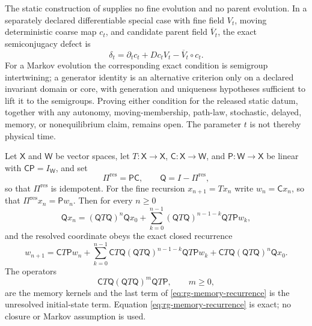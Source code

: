 \medskip
{}
The static construction of  supplies no fine evolution and no
parent evolution. In a separately declared differentiable special case with fine field $V_t$, moving
deterministic coarse map $c_t$, and candidate parent field $\overline V_t$, the exact semiconjugacy
defect is
\begin{equation}
\delta_t=\partial_tc_t+Dc_tV_t-\overline V_t\circ c_t.
\label{eq:rg-pointwise-parent-semiconjugacy-defect}
\end{equation}
For a Markov evolution the corresponding exact condition is semigroup intertwining; a generator
identity is an alternative criterion only on a declared invariant domain or core, with generation
and uniqueness hypotheses sufficient to lift it to the semigroups. Proving either condition for the
released static datum, together with any autonomy, moving-membership, path-law, stochastic,
delayed, memory, or nonequilibrium claim, remains open. The parameter $t$ is not thereby physical
time. 

Let $\mathsf X$ and $\mathsf W$ be vector spaces, let $T:\mathsf X\to\mathsf X$,
$\mathsf C:\mathsf X\to\mathsf W$, and $\mathsf P:\mathsf W\to\mathsf X$ be
linear with $\mathsf C\mathsf P=I_{\mathsf W}$, and set
\begin{equation}
\Pi^{\mathrm{res}}=\mathsf P\mathsf C,
\qquad
\mathsf Q=I-\Pi^{\mathrm{res}},
\label{eq:rg-resolved-projection}
\end{equation}
so that $\Pi^{\mathrm{res}}$ is idempotent.  For the fine recursion
$x_{n+1}=Tx_n$ write $w_n=\mathsf Cx_n$, so that
$\Pi^{\mathrm{res}}x_n=\mathsf Pw_n$.  Then for every $n\geq0$
\begin{equation}
\mathsf Qx_n
=(\mathsf QT\mathsf Q)^n\mathsf Qx_0
+\sum_{k=0}^{n-1}
(\mathsf QT\mathsf Q)^{n-1-k}\mathsf QT\mathsf Pw_k,
\label{eq:rg-unresolved-solution}
\end{equation}
and the resolved coordinate obeys the exact closed recurrence
\begin{equation}
w_{n+1}
=\mathsf CT\mathsf Pw_n
+\sum_{k=0}^{n-1}
\mathsf CT\mathsf Q(\mathsf QT\mathsf Q)^{n-1-k}\mathsf QT\mathsf Pw_k
+\mathsf CT\mathsf Q(\mathsf QT\mathsf Q)^{n}\mathsf Qx_0 .
\label{eq:rg-memory-recurrence}
\end{equation}
The operators
\begin{equation}
\mathsf CT\mathsf Q(\mathsf QT\mathsf Q)^{m}\mathsf QT\mathsf P,
\qquad m\geq0,
\label{eq:rg-memory-operators}
\end{equation}
are the memory kernels and the last term of
\eqref{eq:rg-memory-recurrence} is the unresolved initial-state term.  Equation
\eqref{eq:rg-memory-recurrence} is exact; no closure or Markov assumption is
used. 

